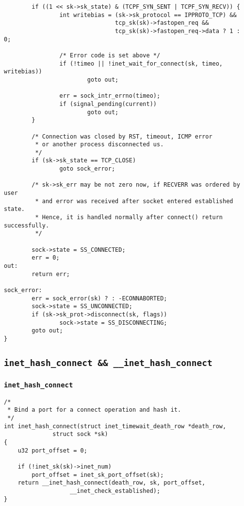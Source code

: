 \begin{verbatim}
        if ((1 << sk->sk_state) & (TCPF_SYN_SENT | TCPF_SYN_RECV)) {
                int writebias = (sk->sk_protocol == IPPROTO_TCP) &&
                                tcp_sk(sk)->fastopen_req &&
                                tcp_sk(sk)->fastopen_req->data ? 1 : 0;

                /* Error code is set above */
                if (!timeo || !inet_wait_for_connect(sk, timeo, writebias))
                        goto out;

                err = sock_intr_errno(timeo);
                if (signal_pending(current))
                        goto out;
        }

        /* Connection was closed by RST, timeout, ICMP error
         * or another process disconnected us.
         */
        if (sk->sk_state == TCP_CLOSE)
                goto sock_error;

        /* sk->sk_err may be not zero now, if RECVERR was ordered by user
         * and error was received after socket entered established state.
         * Hence, it is handled normally after connect() return successfully.
         */

        sock->state = SS_CONNECTED;
        err = 0;
out:
        return err;

sock_error:
        err = sock_error(sk) ? : -ECONNABORTED;
        sock->state = SS_UNCONNECTED;
        if (sk->sk_prot->disconnect(sk, flags))
                sock->state = SS_DISCONNECTING;
        goto out;
}
\end{verbatim}
    
\subsection{\texttt{inet_hash_connect && __inet_hash_connect}}

\subsubsection{\texttt{inet_hash_connect}}
\begin{verbatim}
/*
 * Bind a port for a connect operation and hash it.
 */
int inet_hash_connect(struct inet_timewait_death_row *death_row,
              struct sock *sk)
{
    u32 port_offset = 0;

    if (!inet_sk(sk)->inet_num)
        port_offset = inet_sk_port_offset(sk);
    return __inet_hash_connect(death_row, sk, port_offset,
                   __inet_check_established);
}
\end{verbatim}

